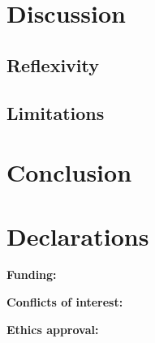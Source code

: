 \documentclass[11pt,a4paper]{article}
\begin{document}
\section{Discussion}
\label{sec:discussion}

\subsection{Reflexivity} %

\subsection{Limitations}

\section{Conclusion}
\label{sec:conclusion}

\section*{Declarations}

\noindent\textbf{Funding:} %

\noindent\textbf{Conflicts of interest:} %

\noindent\textbf{Ethics approval:} %
\end{document}
